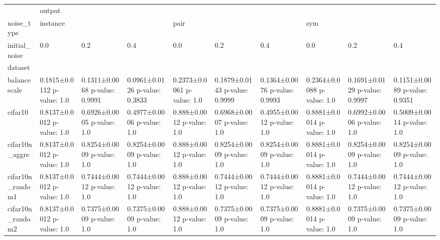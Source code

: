 \begin{tabular}{llllllllll}
\toprule
{} & \multicolumn{9}{l}{output} \\
noise\_type & \multicolumn{3}{l}{instance} & \multicolumn{3}{l}{pair} & \multicolumn{3}{l}{sym} \\
initial\_noise &                         0.0 &                            0.2 &                            0.4 &                         0.0 &                            0.2 &                            0.4 &                         0.0 &                            0.2 &                            0.4 \\
dataset          &                             &                                &                                &                             &                                &                                &                             &                                &                                \\
\midrule
balancescale     &  0.1815±0.0112 p-value: 1.0 &  0.1311±0.0068 p-value: 0.9991 &  0.0961±0.0126 p-value: 0.3833 &  0.2373±0.0061 p-value: 1.0 &  0.1879±0.0143 p-value: 0.9999 &  0.1364±0.0076 p-value: 0.9993 &  0.2364±0.0088 p-value: 1.0 &  0.1691±0.0129 p-value: 0.9997 &  0.1151±0.0089 p-value: 0.9351 \\
cifar10          &  0.8137±0.0012 p-value: 1.0 &     0.6926±0.0005 p-value: 1.0 &     0.4977±0.0006 p-value: 1.0 &   0.888±0.0012 p-value: 1.0 &     0.6968±0.0007 p-value: 1.0 &     0.4955±0.0012 p-value: 1.0 &  0.8881±0.0014 p-value: 1.0 &     0.6992±0.0006 p-value: 1.0 &     0.5009±0.0014 p-value: 1.0 \\
cifar10n\_aggre   &  0.8137±0.0012 p-value: 1.0 &     0.8254±0.0009 p-value: 1.0 &     0.8254±0.0009 p-value: 1.0 &   0.888±0.0012 p-value: 1.0 &     0.8254±0.0009 p-value: 1.0 &     0.8254±0.0009 p-value: 1.0 &  0.8881±0.0014 p-value: 1.0 &     0.8254±0.0009 p-value: 1.0 &     0.8254±0.0009 p-value: 1.0 \\
cifar10n\_random1 &  0.8137±0.0012 p-value: 1.0 &     0.7444±0.0012 p-value: 1.0 &     0.7444±0.0012 p-value: 1.0 &   0.888±0.0012 p-value: 1.0 &     0.7444±0.0012 p-value: 1.0 &     0.7444±0.0012 p-value: 1.0 &  0.8881±0.0014 p-value: 1.0 &     0.7444±0.0012 p-value: 1.0 &     0.7444±0.0012 p-value: 1.0 \\
cifar10n\_random2 &  0.8137±0.0012 p-value: 1.0 &     0.7375±0.0009 p-value: 1.0 &     0.7375±0.0009 p-value: 1.0 &   0.888±0.0012 p-value: 1.0 &     0.7375±0.0009 p-value: 1.0 &     0.7375±0.0009 p-value: 1.0 &  0.8881±0.0014 p-value: 1.0 &     0.7375±0.0009 p-value: 1.0 &     0.7375±0.0009 p-value: 1.0 \\

\end{tabular}
